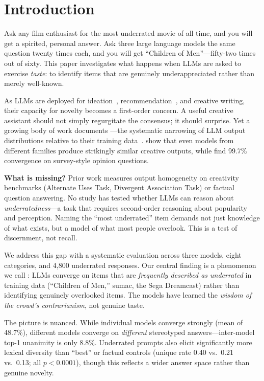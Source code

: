 \section{Introduction}
\label{sec:intro}

Ask any film enthusiast for the most underrated movie of all time, and you will get a spirited, personal answer. Ask three large language models the same question twenty times each, and you will get ``Children of Men''---fifty-two times out of sixty. This paper investigates what happens when LLMs are asked to exercise \emph{taste}: to identify items that are genuinely underappreciated rather than merely well-known.

As LLMs are deployed for ideation~\cite{wu2024generative}, recommendation~\cite{lichtenberg2024popularity}, and creative writing, their capacity for novelty becomes a first-order concern. A useful creative assistant should not simply regurgitate the consensus; it should surprise. Yet a growing body of work documents ---the systematic narrowing of LLM output distributions relative to their training data~\cite{wu2024generative, wenger2025creative}. \citet{wenger2025creative} show that even models from different families produce strikingly similar creative outputs, while \citet{pmc2024diminished} find 99.7\% convergence on survey-style opinion questions.

{\bf What is missing?} Prior work measures output homogeneity on creativity benchmarks (Alternate Uses Task, Divergent Association Task) or factual question answering. No study has tested whether LLMs can reason about \emph{underratedness}---a task that requires second-order reasoning about popularity and perception. Naming the ``most underrated'' item demands not just knowledge of what exists, but a model of what most people overlook. This is a test of discernment, not recall.

We address this gap with a systematic evaluation across three models, eight categories, and 4,800 underrated responses. Our central finding is a phenomenon we call \metapop: LLMs converge on items that are \emph{frequently described as underrated} in training data (\eg ``Children of Men,'' sumac, the Sega Dreamcast) rather than identifying genuinely overlooked items. The models have learned the \emph{wisdom of the crowd's contrarianism}, not genuine taste.

The picture is nuanced. While individual models converge strongly (mean \dominance of 48.7\%), different models converge on \emph{different} stereotyped answers---inter-model top-1 unanimity is only 8.8\%. Underrated prompts also elicit significantly more lexical diversity than ``best'' or factual controls (unique rate 0.40 vs.\ 0.21 vs.\ 0.13; all $p < 0.0001$), though this reflects a wider answer space rather than genuine novelty.

